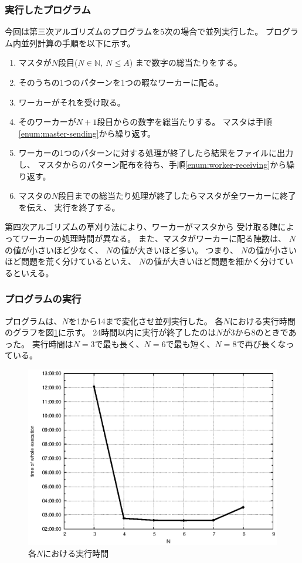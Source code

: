 \subsubsection{実行したプログラム}
今回は第三次アルゴリズムのプログラムを5次の場合で並列実行した。
プログラム内並列計算の手順を以下に示す。
\begin{enumerate}
\item マスタが$N$段目($N \in \mathbb{N}, \ N \leq A$)
	まで数字の総当たりをする。
\item そのうちの1つのパターンを1つの暇なワーカーに配る。 \label{enum:master-sending}
\item ワーカーがそれを受け取る。 \label{enum:worker-receiving}
\item そのワーカーが$N+1$段目からの数字を総当たりする。
	マスタは手順\ref{enum:master-sending}から繰り返す。
\item ワーカーの1つのパターンに対する処理が終了したら結果をファイルに出力し、
	マスタからのパターン配布を待ち、手順\ref{enum:worker-receiving}から繰り返す。
\item マスタの$N$段目までの総当たり処理が終了したらマスタが全ワーカーに終了を伝え、
実行を終了する。
\end{enumerate}

第四次アルゴリズムの草刈り法により、ワーカーがマスタから
受け取る陣によってワーカーの処理時間が異なる。
また、マスタがワーカーに配る陣数は、
$N$の値が小さいほど少なく、
$N$の値が大きいほど多い。
つまり、
$N$の値が小さいほど問題を荒く分けているといえ、
$N$の値が大きいほど問題を細かく分けているといえる。


\subsubsection{プログラムの実行}
プログラムは、$N$を1から14まで変化させ並列実行した。
各$N$における実行時間のグラフを図\ref{pic:allN-time}に示す。
24時間以内に実行が終了したのは$N$が3から8のときであった。
実行時間は$N=3$で最も長く、$N=6$で最も短く、$N=8$で再び長くなっている。

\begin{figure}[htb]
	\begin{center}
\includegraphics[width=\linewidth]{exp3-result.eps}
	\end{center}
	\caption{各$N$における実行時間}
	\label{pic:allN-time}
\end{figure}


